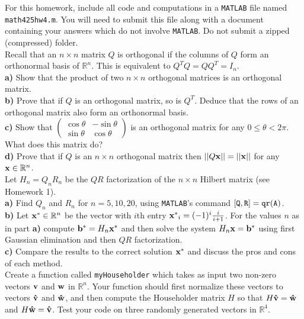 \documentclass[11pt]{amsart}
\theoremstyle{definition}  %
\begin{document}


\noindent For this homework, include all code and computations in a {\tt MATLAB} file named {\tt math425hw4.m}.
You will need to submit this file along with a document containing your answers which do not
involve {\tt MATLAB}. Do not submit a zipped (compressed) folder. \\


 Recall that an $n \times n$ matrix $Q$ is orthogonal if the columns of $Q$ form an orthonormal basis of $\mathbb{R}^n$. This is equivalent to $Q^TQ = QQ^T = I_n$. \\
{\bf a)} Show that the product of two $n \times n$ orthogonal matrices is an orthogonal matrix.  \\
{\bf b)} Prove that if $Q$ is an orthogonal matrix, so is $Q^T$. Deduce that the rows of an orthogonal matrix also form an orthonormal basis. \\
{\bf c)} Show that $\begin{pmatrix} \cos \theta & - \sin \theta \\ \sin \theta & \cos \theta \end{pmatrix}$ is an orthogonal matrix for any $0 \leq \theta < 2\pi$. What does this matrix do? \\
{\bf d)} Prove that if $Q$ is an $n \times n$ orthogonal matrix then $||Q {\bf x} || = ||{\bf x}||$ for any ${\bf x} \in \mathbb{R}^n$. \\

  Let $H_n= Q_nR_n$ be the $QR$ factorization of the $n \times n$ Hilbert matrix (see Homework 1). \\
{\bf a)} Find $Q_n$ and $R_n$ for $n=5,10,20$, using {\tt MATLAB}'s command ${\tt [Q,R] = qr(A)}$.  \\
{\bf b)} Let ${\bf x^*} \in \mathbb{R}^n$ be the vector with $i$th entry ${\bf x^*}_i = (-1)^i \frac{i}{i+1}$. For the values $n$ as in part {\bf a)} compute ${\bf b^*} = H_n{\bf x^*}$ and then
solve the system $H_n{\bf x} = {\bf b^*}$ using first Gaussian elimination and then $QR$ factorization. \\
{\bf c)} Compare the results to the correct solution ${\bf x^*}$ and discuss the pros and cons of each method. \\

 Create a function called {\tt myHouseholder} which takes as input two non-zero vectors ${\bf v}$ and ${\bf w}$ in $\mathbb{R}^n$. Your function
should first normalize these vectors to vectors ${\bf \hat{v}}$ and ${\bf \hat{w}}$, and then compute the Householder matrix $H$ so that $H {\bf \hat{v}} = {\bf \hat{w}}$
and $H {\bf \hat{w}} = {\bf \hat{v}}$. Test your code on three randomly generated vectors in $\mathbb{R}^4$. 





 
\end{document}
